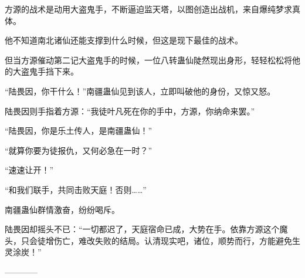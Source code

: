 \begin{this_body}
方源的战术是动用大盗鬼手，不断逼迫监天塔，以图创造出战机，来自爆纯梦求真体。

他不知道南北诸仙还能支撑到什么时候，但这是现下最佳的战术。

但当方源催动第二记大盗鬼手的时候，一位八转蛊仙陡然现出身形，轻轻松松将他的大盗鬼手挡下来。

“陆畏因，你干什么！”南疆蛊仙见到该人，立即叫破他的身份，又惊又怒。

陆畏因则手指着方源：“我徒叶凡死在你的手中，方源，你纳命来罢。”

“陆畏因，你是乐土传人，是南疆蛊仙！”

“就算你要为徒报仇，又何必急在一时？”

“速速让开！”

“和我们联手，共同击败天庭！否则……”

南疆蛊仙群情激奋，纷纷喝斥。

陆畏因却摇头不已：“一切都迟了，天庭宿命已成，大势在手。依靠方源这个魔头，只会徒增伤亡，难改失败的结局。认清现实吧，诸位，顺势而行，方能避免生灵涂炭！”

------------

\end{this_body}

